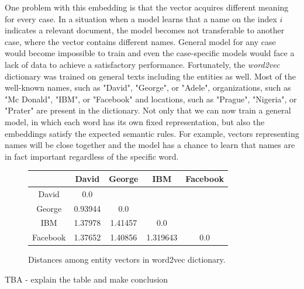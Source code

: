 \documentclass[
  digital, %
  table,   %
  lof,     %
  lot,     %
]{fithesis3}
\begin{document}
One problem with this embedding is that the vector acquires different meaning for every case.
In a situation when a model learns that a name on the index $i$ indicates a relevant document, the model becomes not transferable to another case, where the vector contains different names.
General model for any case would become impossible to train and even the case-specific models would face a lack of data to achieve a satisfactory performance.
Fortunately, the \textit{word2vec} dictionary was trained on general texts including the entities as well.
Most of the well-known names, such as "David", "George", or "Adele", organizations, such as "Mc Donald", "IBM", or "Facebook" and locations, such as "Prague", "Nigeria", or "Prater" are present in the dictionary.
Not only that we can now train a general model, in which each word has its own fixed representation, but also the embeddings satisfy the expected semantic rules.
For example, vectors representing names will be close together and the model has a chance to learn that names are in fact important regardless of the specific word.


\begin{figure}[H]
\centering
\caption{Distances among entity vectors in word2vec dictionary.}
\label{fig:entity_distances}
\begin{tabular}{|*{5}{c|}}
  \hline
           & David   & George  & IBM      & Facebook \\ \hline
  David    & 0.0     &         &          &     \\ \hline
  George   & 0.93944 & 0.0     &          &     \\ \hline
  IBM      & 1.37978 & 1.41457 & 0.0      &     \\ \hline
  Facebook & 1.37652 & 1.40856 & 1.319643 & 0.0 \\ \hline
\end{tabular}
\end{figure}

TBA - explain the table and make conclusion
\end{document}
